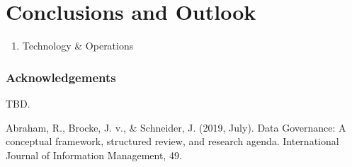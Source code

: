 \documentclass[runningheads]{llncs}
\begin{document}
\section{Conclusions and Outlook}

\begin{enumerate}
    \item Technology \& Operations
\end{enumerate}
\subsubsection{Acknowledgements} TBD.
%
%
%
% 
% 
%
\begin{thebibliography}{8}
 Abraham, R., Brocke, J. v., \& Schneider, J. (2019, July). Data Governance: A conceptual framework, structured review, and research agenda. International Journal of Information Management, 49. 
\end{thebibliography}
\end{document}

